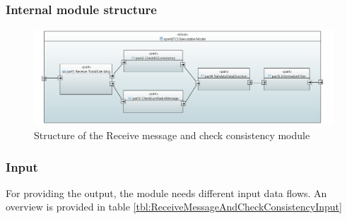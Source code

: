 \documentclass{template/openetcs_report}
\begin{document}

\subsubsection{Internal module structure}
\begin{figure}[H]
 \centering
 \includegraphics[width=\textwidth]{./images/Input-Messages4.PNG}
 \caption{Structure of the Receive message and check consistency module}
 \label{fig:receiveAndCheckConsistencyArch}
\end{figure}
 
\subsubsection{Input}
For providing the output, the module needs different input data flows. An overview is provided in table \ref{tbl:ReceiveMessageAndCheckConsistencyInput}
\end{document}
